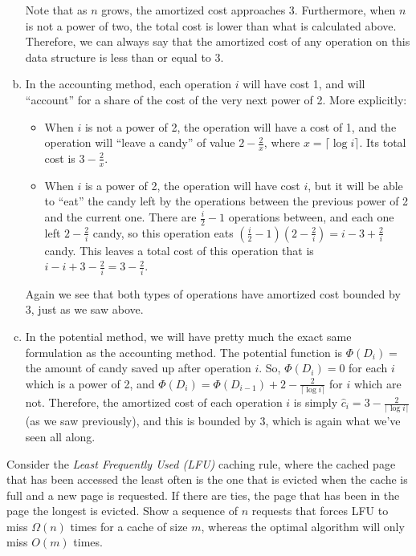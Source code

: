 \documentclass[fleqn]{homework}
\begin{document}
\begin{problem}{5}
\begin{enumerate}[a.]
      Note that as $n$ grows, the amortized cost approaches 3.  Furthermore,
      when $n$ is not a power of two, the total cost is lower than what is
      calculated above.  Therefore, we can always say that the amortized cost of
      any operation on this data structure is less than or equal to 3.
    \item In the accounting method, each operation $i$ will have cost 1, and
      will ``account'' for a share of the cost of the very next power of 2.
      More explicitly:
      \begin{itemize}
      \item When $i$ is not a power of 2, the operation will have a cost of 1,
        and the operation will ``leave a candy'' of value $2 - \frac{2}{x}$,
        where $x = \lceil \log i \rceil$.  Its total cost is $3 - \frac{2}{x}$.
      \item When $i$ is a power of 2, the operation will have cost $i$, but it
        will be able to ``eat'' the candy left by the operations between the
        previous power of 2 and the current one.  There are $\frac{i}{2} - 1$
        operations between, and each one left $2 - \frac{2}{i}$ candy, so this
        operation eats
        $\left(\frac{i}{2} - 1\right)\left(2 - \frac{2}{i}\right) = i - 3 +
        \frac{2}{i}$
        candy.  This leaves a total cost of this operation that is
        $i - i + 3 - \frac{2}{i} = 3 - \frac{2}{i}$.
      \end{itemize}

      Again we see that both types of operations have amortized cost bounded by
      3, just as we saw above.
    \item In the potential method, we will have pretty much the exact same
      formulation as the accounting method.  The potential function is
      $\Phi(D_i) =$ the amount of candy saved up after operation $i$.  So,
      $\Phi(D_i) = 0$ for each $i$ which is a power of 2, and
      $\Phi(D_i) = \Phi(D_{i-1}) + 2 - \frac{2}{\lceil \log i \rceil}$ for $i$
      which are not.  Therefore, the amortized cost of each operation $i$ is
      simply $\hat{c}_i = 3 - \frac{2}{\lceil \log i\rceil}$ (as we saw
      previously), and this is bounded by 3, which is again what we've seen all
      along.
    \end{enumerate}
  \end{problem}

  \begin{problem}{6}
    \begin{question}
      Consider the \textit{Least Frequently Used (LFU)} caching rule, where the
      cached page that has been accessed the least often is the one that is
      evicted when the cache is full and a new page is requested. If there are
      ties, the page that has been in the page the longest is evicted. Show a
      sequence of $n$ requests that forces LFU to miss $\Omega(n)$ times for a
      cache of size $m$, whereas the optimal algorithm will only miss $O(m)$
      times.
    \end{question}
  \end{problem}
\end{document}
